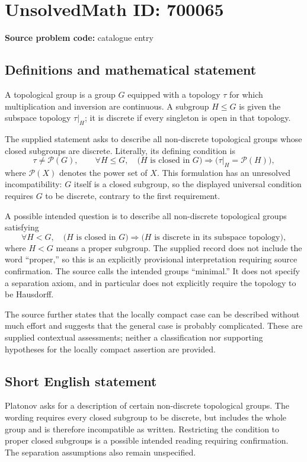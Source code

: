\documentclass[11pt]{article}
\begin{document}
\section*{UnsolvedMath ID: 700065}
\textbf{Source problem code:} catalogue entry
\subsection{Definitions and mathematical statement}
A topological group is a group \(G\) equipped with a topology \(\tau\) for which multiplication and inversion are continuous. A subgroup \(H\leq G\) is given the subspace topology \(\tau|_H\); it is discrete if every singleton is open in that topology.

The supplied statement asks to describe all non-discrete topological groups whose closed subgroups are discrete. Literally, its defining condition is
\[
\tau\neq\mathcal P(G),\qquad
\forall H\leq G,\quad
\bigl(H\text{ is closed in }G\bigr)
\Longrightarrow
\bigl(\tau|_H=\mathcal P(H)\bigr),
\]
where \(\mathcal P(X)\) denotes the power set of \(X\). This formulation has an unresolved incompatibility: \(G\) itself is a closed subgroup, so the displayed universal condition requires \(G\) to be discrete, contrary to the first requirement.

A possible intended question is to describe all non-discrete topological groups satisfying
\[
\forall H<G,\quad
\bigl(H\text{ is closed in }G\bigr)
\Longrightarrow
\bigl(H\text{ is discrete in its subspace topology}\bigr),
\]
where \(H<G\) means a proper subgroup. The supplied record does not include the word ``proper,'' so this is an explicitly provisional interpretation requiring source confirmation. The source calls the intended groups ``minimal.'' It does not specify a separation axiom, and in particular does not explicitly require the topology to be Hausdorff.

The source further states that the locally compact case can be described without much effort and suggests that the general case is probably complicated. These are supplied contextual assessments; neither a classification nor supporting hypotheses for the locally compact assertion are provided.
\subsection{Short English statement}
Platonov asks for a description of certain non-discrete topological groups. The wording requires every closed subgroup to be discrete, but includes the whole group and is therefore incompatible as written. Restricting the condition to proper closed subgroups is a possible intended reading requiring confirmation. The separation assumptions also remain unspecified.
\end{document}
